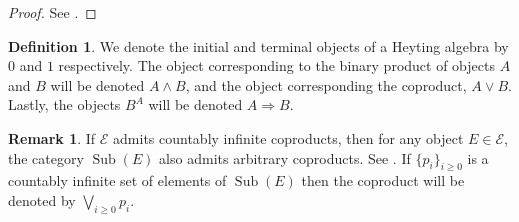 \documentclass{birkjour}
\theoremstyle{plain}
\theoremstyle{definition}
\newtheorem{definition}[thm]{Definition} %
\newtheorem{remark}[thm]{Remark}
\newcommand{\call}[1]{\mathcal{#1}}
\begin{document}
	\begin{proof}
		See \cite[\S A1.4]{Johnstone}.
	\end{proof}
	\begin{definition}
		\label{heytingnotation}
		We denote the initial and terminal objects of a Heyting algebra by $0$ and $1$ respectively. The object corresponding to the binary product of objects $A$ and $B$ will be denoted $A \wedge B$, and the object corresponding the coproduct, $A \vee B$. Lastly, the objects $B^A$ will be denoted $A \Rightarrow B$.
	\end{definition}
	\begin{remark}
		\label{rmk:countable_colimits}
		If $\call{E}$ admits countably infinite coproducts, then for any object $E \in \call{E}$, the category $\operatorname{Sub}(E)$ also admits arbitrary coproducts. See \cite[\S A1.4]{Johnstone}. If $\lbrace p_i \rbrace_{i \geq 0}$ is a countably infinite set of elements of $\operatorname{Sub}(E)$ then the coproduct will be denoted by $\bigvee_{i\geq 0}p_i$.
	\end{remark}
	
\end{document}
